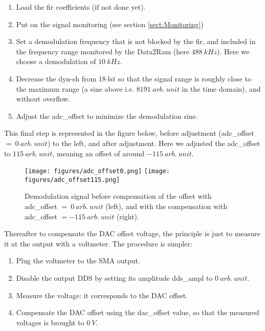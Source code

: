 \documentclass[12pt,oneside]{article}
\begin{document}
\vspace{0.3cm}
\begin{enumerate}
	\setlength\itemsep{-0.1cm}
	\item Load the fir coefficients (if not done yet).
	\item Put on the signal monitoring (see section \ref{sect:Monitoring})
	\item Set a demodulation frequency that is not blocked by the fir, and included in the frequency range monitored by the Data2Ram (here $488~kHz$). Here we choose a demodulation of $10~kHz$. 
	\item Decrease the dyn-sh from $18~bit$ so that the signal range is roughly close to the maximum range (a sine above i.e. $8191~arb.~unit$ in the time domain), and without overflow.
	\item Adjust the adc\_offset to minimize the demodulation sine. 
\end{enumerate}
\vspace{0.3cm}

This final step is represented in the figure below, before adjustment (adc\_offset $=~0~arb.~unit$) to the left, and after adjustment. Here we adjusted the adc\_offset to $115~arb.~unit$, meaning an offset of around $-115~arb.~unit$.

\begin{figure}[h!tb]
	\begin{center}
		\vspace{0.5cm}
		\texttt{[image: figures/adc\_offset0.png]}
		\texttt{[image: figures/adc\_offset115.png]}
		\caption{Demodulation signal before compensation of the offset with adc\_offset $=~0~arb.~unit$ (left), and with the compensation with adc\_offset $=-115~arb.~unit$ (right).}
		\label{fig:adc_offset}
	\end{center}
\end{figure}
\vspace{2cm}
Thereafter to compensate the DAC offset voltage, the principle is just to measure it at the output with a voltmeter. The procedure is simpler:

\vspace{0.3cm}
\begin{enumerate}
	\setlength\itemsep{-0.1cm}
	\item Plug the voltmeter to the SMA output.
	\item Disable the output DDS by setting its amplitude dds\_ampl to $0~arb.~unit$.
	\item Measure the voltage: it corresponds to the DAC offset.
	\item Compensate the DAC offset using the dac\_offset value, so that the measured voltages is brought to $0~V$.
\end{enumerate}
\vspace{0.3cm}
\end{document}
